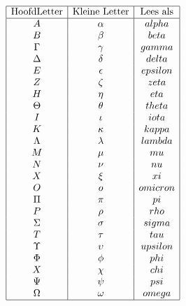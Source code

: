 \documentclass[lineaire_algebra_oplossingen.tex]{subfiles}
\begin{document}
\begin{center}
\[
\begin{array}{| c | c | c |}
\hline
\text{HoofdLetter} & \text{Kleine Letter}	& \text{Lees als}\\
\hline
A			& \alpha	& alpha\\
B			& \beta		& beta\\
\Gamma 		& \gamma 	& gamma\\
\Delta 		& \delta 	& delta\\
E			& \epsilon	& epsilon\\
Z			& \zeta		& zeta\\
H			& \eta 		& eta\\
\Theta 		& \theta 	& theta\\
I			& \iota 	& iota\\
K			& \kappa 	& kappa\\
\Lambda 	& \lambda	& lambda\\
M			& \mu 		& mu\\
N			& \nu 		& nu\\
X 		& \xi 		& xi\\
O			& o			& omicron\\
\Pi 		& \pi 		& pi\\
P			& \rho 		& rho\\
\Sigma 		& \sigma 	& sigma\\
T			& \tau 		& tau\\
\Upsilon 	& \upsilon 	& upsilon\\
\Phi 		& \phi 		& phi\\
X			& \chi 		& chi\\
\Psi 		& \psi 		& psi\\
\Omega 		& \omega	& omega\\
\hline
\end{array}
\]
\end{center}
\end{document}
